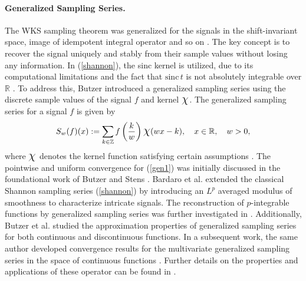 \documentclass[11pt, a4paper]{article}
\theoremstyle{definition}
\numberwithin{equation}{section}
\def\ZZ{\mathbb Z}
\def\RR{\mathbb R}
\def\Chi{\mbox{\Large$\chi$}}
\def\sinc{\text{sinc}}
\begin{document}
\paragraph{Generalized Sampling Series.} 
The WKS sampling theorem was generalized for the signals in the shift-invariant space, image of idempotent integral operator and so on \cite{shift}. The key concept is to recover the signal uniquely and stably from their sample values without losing any information. In (\ref{shannon}), the sinc kernel is utilized, due to its computational limitations and the fact that $\sinc\,t$ is not absolutely integrable over \(\mathbb{R}\) \cite{vgood}. To address this, Butzer  \cite{butzer1, past} introduced a generalized sampling series using the discrete sample values of the signal $f$ and kernel $\Chi$.
The generalized sampling series for a signal $f$ is given by 
\begin{equation}\label{gen1}
    S_w(f)(x) :=\sum_{k\in \ZZ} f\left(\frac{k}{w} \right)\Chi(wx-k),\quad x \in \RR, \quad w>0,
\end{equation}
where $\Chi$ denotes the kernel function satisfying certain assumptions \cite{past}. 
The pointwise and uniform convergence for (\ref{gen1}) was initially discussed in the foundational work of Butzer and Stens \cite{butzer1, past}.
Bardaro et al. \cite{delta} extended the classical Shannon sampling series (\ref{shannon}) by introducing an $L^p$ averaged modulus of smoothness to characterize intricate signals. The reconstruction of $p$-integrable functions by generalized sampling series was further investigated in \cite{vgood}. 
Additionally, Butzer et al. \cite{butzer1} studied the approximation properties of generalized sampling series for both continuous and discontinuous functions. In a subsequent work, the same author developed convergence results for the multivariate generalized sampling series in the space of continuous functions \cite{multigen}. Further details on the properties and applications of these operator can be found in  \cite{delta, but,multigen,butzer1,  vgood}.
    
\end{document}
